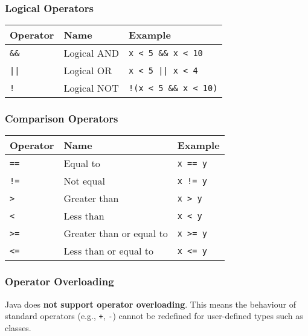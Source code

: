 \documentclass{article}
\begin{document}
\vspace{1em}
\subsubsection{Logical Operators}
\begin{center}
\begin{tabular}{@{}lll@{}}
\toprule
\textbf{Operator} & \textbf{Name} & \textbf{Example} \\
\midrule
\texttt{\&\&} & Logical AND & \texttt{x < 5 \&\& x < 10} \\
\texttt{||}  & Logical OR  & \texttt{x < 5 || x < 4} \\
\texttt{!}   & Logical NOT & \texttt{!(x < 5 \&\& x < 10)} \\
\bottomrule
\end{tabular}
\end{center}

\vspace{1em}
\subsubsection{Comparison Operators}
\begin{center}
\begin{tabular}{@{}lll@{}}
\toprule
\textbf{Operator} & \textbf{Name} & \textbf{Example} \\
\midrule
\texttt{==} & Equal to                 & \texttt{x == y} \\
\texttt{!=} & Not equal                & \texttt{x != y} \\
\texttt{>}  & Greater than             & \texttt{x > y} \\
\texttt{<}  & Less than                & \texttt{x < y} \\
\texttt{>=} & Greater than or equal to & \texttt{x >= y} \\
\texttt{<=} & Less than or equal to    & \texttt{x <= y} \\
\bottomrule
\end{tabular}
\end{center}

\subsubsection{Operator Overloading}

Java does \textbf{not support operator overloading}. This means the behaviour of standard operators (e.g., \texttt{+}, \texttt{-}) cannot be redefined for user-defined types such as classes.
\end{document}

